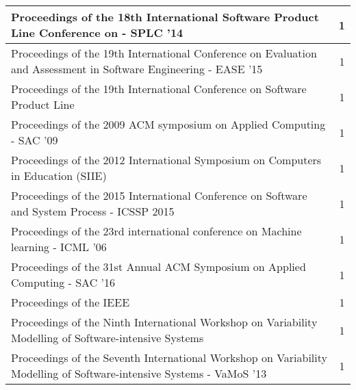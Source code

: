 \begin{longtable}{|p{11cm}|c|}
	Proceedings of the 18th International Software Product Line Conference on - SPLC '14                                                                                                    & 1        \\ \hline
	Proceedings of the 19th International Conference on Evaluation and Assessment in Software Engineering - EASE '15                                                                        & 1        \\ \hline
	Proceedings of the 19th International Conference on Software Product Line                                                                                                               & 1        \\ \hline
	Proceedings of the 2009 ACM symposium on Applied Computing - SAC '09                                                                                                                    & 1        \\ \hline
	Proceedings of the 2012 International Symposium on Computers in Education (SIIE)                                                                                                        & 1        \\ \hline
	Proceedings of the 2015 International Conference on Software and System Process - ICSSP 2015                                                                                            & 1        \\ \hline
	Proceedings of the 23rd international conference on Machine learning - ICML '06                                                                                                         & 1        \\ \hline
	Proceedings of the 31st Annual ACM Symposium on Applied Computing - SAC '16                                                                                                             & 1        \\ \hline
	Proceedings of the IEEE                                                                                                                                                                 & 1        \\ \hline
	Proceedings of the Ninth International Workshop on Variability Modelling of Software-intensive Systems                                                                                  & 1        \\ \hline
	Proceedings of the Seventh International Workshop on Variability Modelling of Software-intensive Systems - VaMoS '13                                                                    & 1        \\ \hline

\end{longtable}
